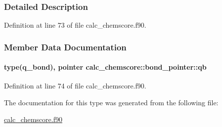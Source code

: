 \subsubsection{Detailed Description}


Definition at line 73 of file calc\-\_\-chemscore.\-f90.



\subsubsection{Member Data Documentation}
\hypertarget{structcalc__chemscore_1_1bond__pointer_a81412f914796a27ac52ec9bb35631cef}{
\paragraph[{qb}]{\setlength{\rightskip}{0pt plus 5cm}type({\bf q\-\_\-bond}), pointer calc\-\_\-chemscore\-::bond\-\_\-pointer\-::qb}}\label{structcalc__chemscore_1_1bond__pointer_a81412f914796a27ac52ec9bb35631cef}


Definition at line 74 of file calc\-\_\-chemscore.\-f90.



The documentation for this type was generated from the following file\-:\begin{DoxyCompactItemize}
\item 
\hyperlink{calc__chemscore_8f90}{calc\-\_\-chemscore.\-f90}\end{DoxyCompactItemize}
